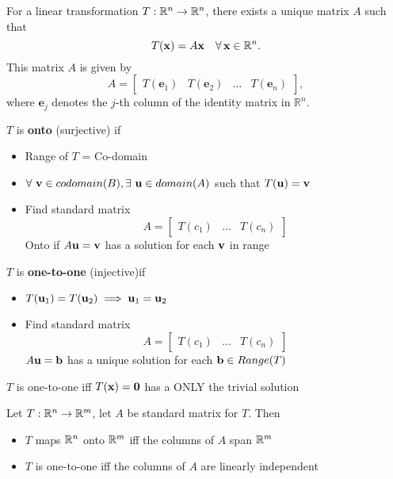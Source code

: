 \documentclass{report}
\begin{document}
\begin{theorem}
For a linear transformation \( T: \mathbb{R}^n \to \mathbb{R}^n \), there exists a unique matrix \( A \) such that
\[
T(\mathbf{x}) = A \mathbf{x} \quad \forall \, \mathbf{x} \in \mathbb{R}^n.
\]
This matrix \( A \) is given by
\[
    A = \begin{bmatrix} T(\mathbf{e}_1) & T(\mathbf{e}_2) & \dots & T(\mathbf{e}_n) \end{bmatrix},
    \]
    where \( \mathbf{e}_j \) denotes the \( j \)-th column of the identity matrix in \( \mathbb{R}^n \).
\end{theorem}


\begin{definition}
    $T$ is \textbf{onto} (surjective) if
    \begin{itemize}
    \item Range of $T$ = Co-domain
    \item $\forall \ \vv \in codomain (B), \exists \ 
    \uu \in domain (A)$ such that $T(\mathbf{u})=\mathbf{v}$
    \item Find standard matrix 
    \[
    A = \begin{bmatrix}
        T(c_1) & \ldots & T(c_n)
    \end{bmatrix}
    \]
    Onto if $A \mathbf{u} = \mathbf{v}$ has a solution for each $\mathbf{v}$ in range
    \end{itemize}
\end{definition}

\begin{definition}
$T$ is \textbf{one-to-one} (injective)if
\begin{itemize}
    \item $T(\mathbf{u}_1) = T(\mathbf{u}_2) \implies \mathbf{u}_1 = \mathbf{u}_2$
    \item Find standard matrix 
    \[
    A = \begin{bmatrix}
        T(c_1) & \ldots & T(c_n)
    \end{bmatrix}
    \]
    $A \mathbf{u} = \mathbf{b}$ has a unique solution for each $\mathbf{b} \in Range(T)$
\end{itemize}
\end{definition}


\begin{theorem}
    $T$ is one-to-one iff $T(\mathbf{x}) = \mathbf{0}$ has a ONLY the trivial solution
\end{theorem}

\begin{theorem}
    Let $T: \mathbb{R}^n \to \mathbb{R}^m$, let $A$ be standard matrix for $T$. Then 
    \begin{itemize}
        \item $T$ maps $\mathbb{R}^n$ onto $\mathbb{R}^m$ iff the columns of $A$ span $\mathbb{R}^m$
        \item $T$ is one-to-one iff the columns of $A$ are linearly independent
    \end{itemize}
\end{theorem}
\end{document}
